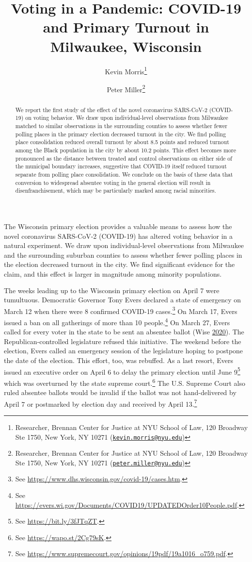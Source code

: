 \documentclass[
  12pt,
]{article}
\title{Voting in a Pandemic: COVID-19 and Primary Turnout in Milwaukee, Wisconsin}
\author{Kevin Morris\footnote{Researcher, Brennan Center for Justice at NYU School of Law, 120 Broadway Ste 1750, New York, NY 10271 (\href{mailto:kevin.morris@nyu.edu}{\nolinkurl{kevin.morris@nyu.edu}})} \and Peter Miller\footnote{Researcher, Brennan Center for Justice at NYU School of Law, 120 Broadway Ste 1750, New York, NY 10271 (\href{mailto:peter.miller@nyu.edu}{\nolinkurl{peter.miller@nyu.edu}})}}
\date{June 23, 2020

Word Count: 3,196}
\begin{document}
\maketitle
\begin{abstract}
We report the first study of the effect of the novel coronavirus SARS-CoV-2 (COVID-19) on voting behavior. We draw upon individual-level observations from Milwaukee matched to similar observations in the surrounding counties to assess whether fewer polling places in the primary election decreased turnout in the city. We find polling place consolidation reduced overall turnout by about 8.5 points and reduced turnout among the Black population in the city by about 10.2 points. This effect becomes more pronounced as the distance between treated and control observations on either side of the municipal boundary increases, suggestive that COVID-19 itself reduced turnout separate from polling place consolidation. We conclude on the basis of these data that conversion to widespread absentee voting in the general election will result in disenfranchisement, which may be particularly marked among racial minorities.
\end{abstract}

\pagebreak

\doublespacing

The Wisconsin primary election provides a valuable means to assess how the novel coronavirus SARS-CoV-2 (COVID-19) has altered voting behavior in a natural experiment. We draw upon individual-level observations from Milwaukee and the surrounding suburban counties to assess whether fewer polling places in the election decreased turnout in the city. We find significant evidence for the claim, and this effect is larger in magnitude among minority populations.

The weeks leading up to the Wisconsin primary election on April 7 were tumultuous. Democratic Governor Tony Evers declared a state of emergency on March 12 when there were 8 confirmed COVID-19 cases.\footnote{See \url{https://www.dhs.wisconsin.gov/covid-19/cases.htm}.} On March 17, Evers issued a ban on all gatherings of more than 10 people.\footnote{See \url{https://evers.wi.gov/Documents/COVID19/UPDATEDOrder10People.pdf}.} On March 27, Evers called for every voter in the state to be sent an absentee ballot (Wise \protect\hyperlink{ref-Wise2020}{2020}). The Republican-controlled legislature refused this initiative. The weekend before the election, Evers called an emergency session of the legislature hoping to postpone the date of the election. This effort, too, was rebuffed. As a last resort, Evers issued an executive order on April 6 to delay the primary election until June 9\footnote{See \url{https://bit.ly/3fJTqZT}.} which was overturned by the state supreme court.\footnote{See \url{https://wapo.st/2Cg79sK}.} The U.S. Supreme Court also ruled absentee ballots would be invalid if the ballot was not hand-delivered by April 7 or postmarked by election day and received by April 13.\footnote{See \url{https://www.supremecourt.gov/opinions/19pdf/19a1016_o759.pdf}.}
\end{document}
